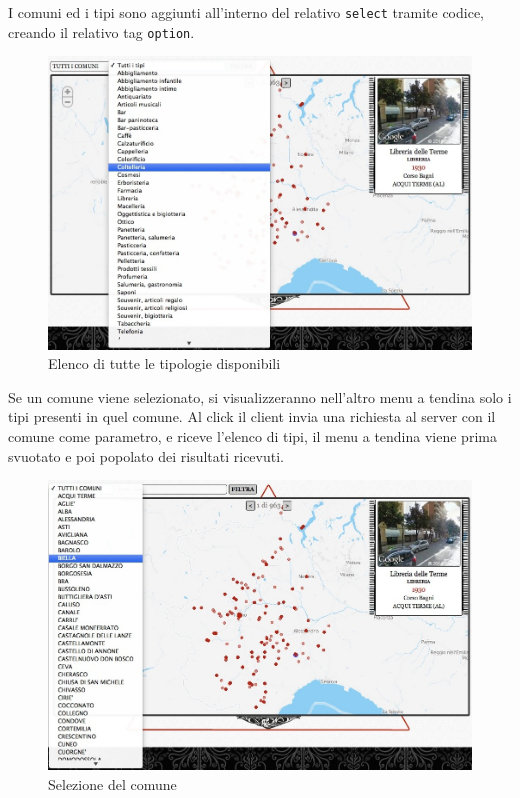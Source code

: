 I comuni ed i tipi sono aggiunti all'interno del relativo \texttt{select} tramite codice, creando il relativo tag \texttt{option}.

\begin{figure}[ht!]
	\caption{Elenco di tutte le tipologie disponibili}
	\label{fig:tipo}
	\centering
		\includegraphics[width=\textwidth]{img/s2.jpg}
\end{figure}

Se un comune viene selezionato, si visualizzeranno nell'altro menu a tendina solo i tipi presenti in quel comune. Al click il client invia una richiesta al server con il comune come parametro, e riceve l'elenco di tipi, il menu a tendina viene prima svuotato e poi popolato dei risultati ricevuti.

\begin{figure}[ht!]
	\caption{Selezione del comune}
	\label{fig:comuni}
	\centering
		\includegraphics[width=\textwidth]{img/s3.jpg}
\end{figure}

